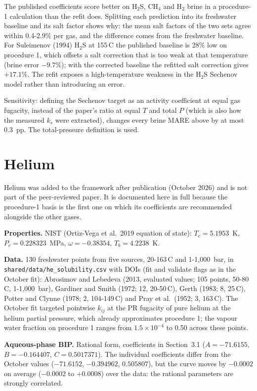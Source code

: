 \documentclass[10pt,a4paper]{article}
\begin{document}
The published coefficients score better on H$_2$S, CH$_4$ and H$_2$ brine in a procedure-1 calculation than the refit does. Splitting each prediction into its freshwater baseline and its salt factor shows why: the mean salt factors of the two sets agree within 0.4-2.9\% per gas, and the difference comes from the freshwater baseline. For Suleimenov (1994) H$_2$S at 155\,\textdegree C the published baseline is 28\% low on procedure 1, which offsets a salt correction that is too weak at that temperature (brine error $-9.7$\%); with the corrected baseline the refitted salt correction gives $+17.1$\%. The refit exposes a high-temperature weakness in the H$_2$S Sechenov model rather than introducing an error.

Sensitivity: defining the Sechenov target as an activity coefficient at equal gas fugacity, instead of the paper's ratio at equal $T$ and total $P$ (which is also how the measured $k_s$ were extracted), changes every brine MARE above by at most 0.3~pp. The total-pressure definition is used.

\section{Helium}\label{sec:he}

Helium was added to the framework after publication (October 2026) and is not part of the peer-reviewed paper. It is documented here in full because the procedure-1 basis is the first one on which its coefficients are recommended alongside the other gases.

\textbf{Properties.} NIST (Ortiz-Vega et al.\ 2019 equation of state): $T_c = 5.1953$~K, $P_c = 0.228323$~MPa, $\omega = -0.38354$, $T_b = 4.2238$~K.

\textbf{Data.} 130 freshwater points from five sources, 20-163\,\textdegree C and 1-1,000~bar, in \texttt{shared/data/he\_solubility.csv} with DOIs (fit and validate flags as in the October fit): Abrosimov and Lebedeva (2013, evaluated values; 105 points, 50-80\,\textdegree C, 1-1,000~bar), Gardiner and Smith (1972; 12, 20-50\,\textdegree C), Gerth (1983; 8, 25\,\textdegree C), Potter and Clynne (1978; 2, 104-149\,\textdegree C) and Pray et al.\ (1952; 3, 163\,\textdegree C). The October fit targeted pointwise $k_{ij}$ at the PR fugacity of pure helium at the helium partial pressure, which already approximates procedure 1; the vapour water fraction on procedure 1 ranges from $1.5\times10^{-4}$ to 0.50 across these points.

\textbf{Aqueous-phase BIP.} Rational form, coefficients in Section~3.1 ($A = -71.6155$, $B = -0.164407$, $C = 0.5017371$). The individual coefficients differ from the October values ($-71.6152$, $-0.394962$, $0.505807$), but the curve moves by $-0.0002$ on average ($-0.0002$ to $+0.0008$) over the data: the rational parameters are strongly correlated.
\end{document}
